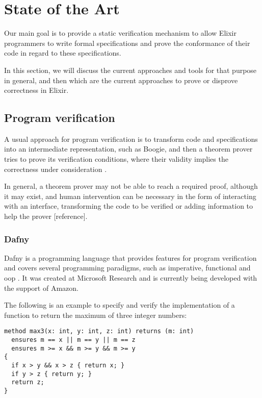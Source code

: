 \chapter{State of the Art}
\label{cap:stateOfTheArt}


Our main goal is to provide a static verification mechanism to allow Elixir
programmers to write formal specifications and prove the conformance of their 
code in regard to these specifications. 

In this section, we will discuss the current approaches and tools for that purpose
in general, and then which are the current approaches to prove or disprove correctness
in Elixir.

\section{Program verification}

A usual approach for program verification is to transform code and specifications into
an intermediate representation, such as Boogie, and then a theorem prover
tries to prove its verification conditions, where their validity implies the correctness
under consideration \citep{Boogie2}.

In general, a theorem prover may not be able to reach a required proof, although it may exist,
and human intervention can be necessary in the form of interacting with an interface, transforming
the code to be verified or adding information to help the prover [reference].

\subsection{Dafny}

Dafny is a programming language that provides features for program verification and 
covers several programming paradigms, such as imperative, functional and \gls{oop} \citep{DafnyManual}. 
It was created at Microsoft Research and is currently being developed with the support of Amazon.

The following is an example to specify and verify the implementation of a function to return 
the maximum of three integer numbers:

\begin{verbatim}
method max3(x: int, y: int, z: int) returns (m: int)
  ensures m == x || m == y || m == z
  ensures m >= x && m >= y && m >= y
{
  if x > y && x > z { return x; }
  if y > z { return y; }
  return z;
}
\end{verbatim}

